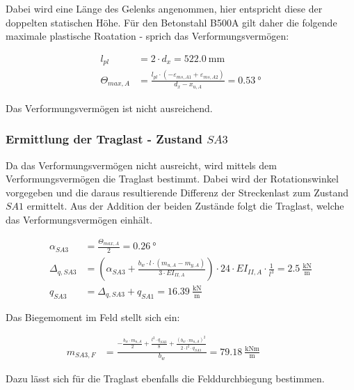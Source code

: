 \documentclass[
  11pt,
  letterpaper,
]{scrreprt}
\begin{document}
Dabei wird eine Länge des Gelenks angenommen, hier entspricht diese der
doppelten statischen Höhe. Für den Betonstahl B500A gilt daher die
folgende maximale plastische Roatation - sprich das Verformungsvermögen:

\[
\begin{aligned}
l_{pl}& = 2 \cdot d_{x} = 522.0 \ \mathrm{mm} \\ 
\Theta_{max , A}& = \frac{l_{pl} \cdot \left(- \varepsilon_{m s , A1} + \varepsilon_{m s , A2}\right)}{d_{x} - x_{u , A}} = 0.53 \ \mathrm{°} \end{aligned}
\]

Das Verformungsvermögen ist nicht ausreichend.

\subsubsection{\texorpdfstring{Ermittlung der Traglast - Zustand
\(SA3\)}{Ermittlung der Traglast - Zustand SA3}}\label{ermittlung-der-traglast---zustand-sa3}

Da das Verformungsvermögen nicht ausreicht, wird mittels dem
Verformungsvermögen die Traglast bestimmt. Dabei wird der
Rotationswinkel vorgegeben und die daraus resultierende Differenz der
Streckenlast zum Zustand \(SA1\) ermittelt. Aus der Addition der beiden
Zustände folgt die Traglast, welche das Verformungsvermögen einhält.

\[
\begin{aligned}
\alpha_{SA3}& = \frac{\Theta_{max , A}}{2} = 0.26 \ \mathrm{°} \\ 
\Delta_{q , SA3}& = \left(\alpha_{SA3} + \frac{b_{w} \cdot l \cdot \left(m_{u , A} - m_{y , A}\right)}{3 \cdot EI_{II , A}}\right) \cdot 24 \cdot EI_{II , A} \cdot \frac{1}{l^{3}} = 2.5 \ \frac{\mathrm{kN}}{\mathrm{m}} \\ 
q_{SA3}& = \Delta_{q , SA3} + q_{SA1} = 16.39 \ \frac{\mathrm{kN}}{\mathrm{m}} \end{aligned}
\]

Das Biegemoment im Feld stellt sich ein:

\[
\begin{aligned}
m_{SA3 , F}& = \frac{- \frac{b_{w} \cdot m_{u , A}}{2} + \frac{l^{2} \cdot q_{SA3}}{8} + \frac{\left(b_{w} \cdot m_{u , A}\right)^{2}}{2 \cdot l^{2} \cdot q_{SA3}}}{b_{w}} = 79.18 \ \frac{\mathrm{kNm}}{\mathrm{m}} \quad &  \quad &  
 \end{aligned}
\]

Dazu lässt sich für die Traglast ebenfalls die Felddurchbiegung
bestimmen.
\end{document}
